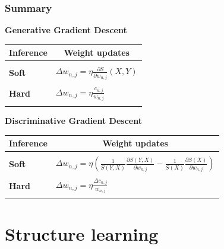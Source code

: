 \documentclass[usenames,dvipsnames]{beamer}
\newcommand{\ddspn}[2]{\frac{\partial#1}{\partial#2}}
\begin{document}
\begin{frame}
  \frametitle{Summary}

  \scriptsize
  \begin{center}\footnotesize\textbf{Generative Gradient Descent}\end{center}\vspace{-0.25cm}
  \begin{table}[h]
    \centering
    \begin{tabular}{l|l}
      \hline
      \multicolumn{1}{c}{\bfseries Inference} & \multicolumn{1}{c}{\bfseries Weight updates}\\
      \hline & \\
      \textbf{Soft} & \(\displaystyle \Delta w_{n,j}=\eta\ddspn{S}{w_{n,j}}(X, Y)\) \\
      & \\
      \textbf{Hard} & \(\displaystyle \Delta w_{n,j}=\eta\frac{c_{n,j}}{w_{n,j}}\) \\
      & \\
      \hline
    \end{tabular}
  \end{table}

  \begin{center}\footnotesize\textbf{Discriminative Gradient Descent}\end{center}\vspace{-0.25cm}
  \begin{table}[h]
    \centering
    \begin{tabular}{l|l}
      \hline
      \multicolumn{1}{c}{\bfseries Inference} & \multicolumn{1}{c}{\bfseries Weight updates}\\
      \hline & \\
      \textbf{Soft} & \(\displaystyle \Delta
        w_{n,j}=\eta\left(\frac{1}{S(Y,X)}\ddspn{S(Y,X)}{w_{n,j}}-\frac{1}{S(X)}
          \ddspn{S(X)}{w_{n,j}}\right)\) \\
      & \\
      \textbf{Hard} & \(\displaystyle \Delta w_{n,j}=\eta\frac{\Delta c_{n,j}}{w_{n,j}}\) \\
      & \\
      \hline
    \end{tabular}
  \end{table}

\end{frame}

\section{Structure learning}
\end{document}

